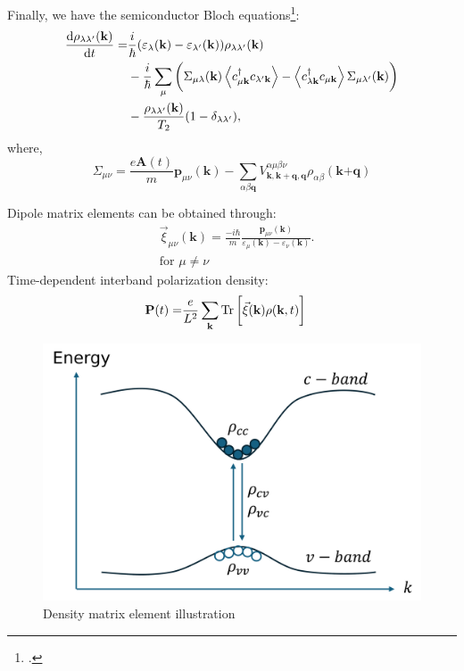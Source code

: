 \documentclass{beamer}
\begin{document}
\begin{frame}
Finally, we have the semiconductor Bloch equations\footcite{haug_quantum_2009}:
\begin{align}
	\dv{\rho_{\lambda\lambda'}(\textbf{k})}{t} = &\frac{i}{\hbar} (\varepsilon_{\lambda}(\textbf{k}) - \varepsilon_{\lambda'}(\textbf{k}))\rho_{\lambda\lambda'}(\textbf{k})\nonumber\\
	&-\frac{i}{\hbar} \sum_{\mu}\bigg(\Sigma_{\mu \lambda}(\textbf{k}) \ev{c^{\dagger}_{\mu\textbf{k}} c_{\lambda'\textbf{k}}} - \ev{c^{\dagger}_{\lambda\textbf{k}} c_{\mu\textbf{k}}} \Sigma_{\mu \lambda'}(\textbf{k})\bigg)\\ &-\frac{\rho_{\lambda\lambda'}(\textbf{k})}{T_2}(1-\delta_{\lambda\lambda'}),\nonumber
\end{align}
where,
\begin{equation}
	\Sigma_{\mu\nu} = \frac{e\textbf{A}(t)}{m}\textbf{p}_{\mu\nu}(\textbf{k}) - \sum_{\alpha\beta\textbf{q}} V^{\alpha \mu \beta \nu}_{\textbf{k},\textbf{k}+\textbf{q},\textbf{q}}\rho_{\alpha \beta}(\textbf{k+q})
\end{equation}
\end{frame}
\begin{frame}
	\begin{multicols}{2}
		Dipole matrix elements can be obtained through:
		\begin{align}
			&\vec{\xi}_{\mu\nu}(\textbf{k}) = \frac{-i\hbar}{m}\frac{\textbf{p}_{\mu\nu}(\textbf{k})}{\varepsilon_{\mu}(\textbf{k}) - \varepsilon_{\nu}(\textbf{k})}.\\
			&\text{for } \mu \neq \nu \nonumber
		\end{align}
		Time-dependent interband polarization density:
		\begin{align}
			\textbf{P}(t) = &\frac{e}{L^2} \sum_{\textbf{k}} \Tr\bigg[\vec{\xi}(\textbf{k})\rho(\textbf{k},t)\bigg]
		\end{align}
		\columnbreak
		\begin{figure}
			\includegraphics[width=1\linewidth]{images/cvbeamer.pdf}
			\caption{Density matrix element illustration}
		\end{figure}
	\end{multicols}
\end{frame}
\end{document}
